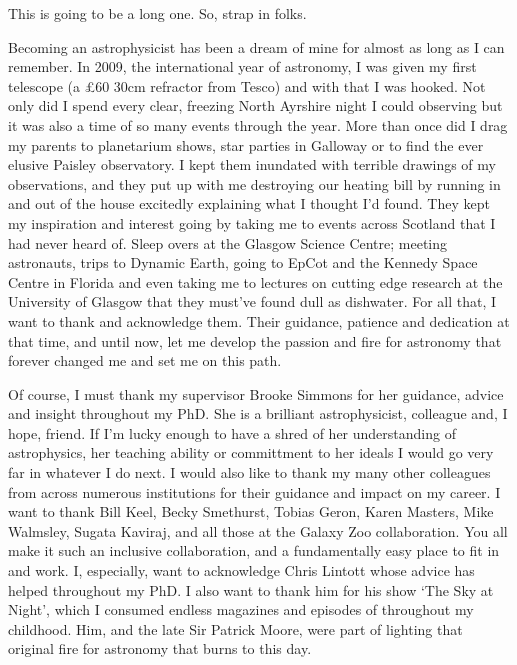 

\begin{acknowledgements}      %
This is going to be a long one. So, strap in folks.

Becoming an astrophysicist has been a dream of mine for almost as long as I can remember. In 2009, the international year of astronomy, I was given my first telescope (a £60 30cm refractor from Tesco) and with that I was hooked. Not only did I spend every clear, freezing North Ayrshire night I could observing but it was also a time of so many events through the year. More than once did I drag my parents to planetarium shows, star parties in Galloway or to find the ever elusive Paisley observatory. I kept them inundated with terrible drawings of my observations, and they put up with me destroying our heating bill by running in and out of the house excitedly explaining what I thought I'd found. They kept my inspiration and interest going by taking me to events across Scotland that I had never heard of. Sleep overs at the Glasgow Science Centre; meeting astronauts, trips to Dynamic Earth, going to EpCot and the Kennedy Space Centre in Florida and even taking me to lectures on cutting edge research at the University of Glasgow that they must've found dull as dishwater. For all that, I want to thank and acknowledge them. Their guidance, patience and dedication at that time, and until now, let me develop the passion and fire for astronomy that forever changed me and set me on this path.

Of course, I must thank my supervisor Brooke Simmons for her guidance, advice and insight throughout my PhD. She is a brilliant astrophysicist, colleague and, I hope, friend. If I'm lucky enough to have a shred of her understanding of astrophysics, her teaching ability or committment to her ideals I would go very far in whatever I do next. I would also like to thank my many other colleagues from across numerous institutions for their guidance and impact on my career. I want to thank Bill Keel, Becky Smethurst, Tobias Geron, Karen Masters, Mike Walmsley, Sugata Kaviraj, and all those at the Galaxy Zoo collaboration. You all make it such an inclusive collaboration, and a fundamentally easy place to fit in and work. I, especially, want to acknowledge Chris Lintott whose advice has helped throughout my PhD. I also want to thank him for his show `The Sky at Night', which I consumed endless magazines and episodes of throughout my childhood. Him, and the late Sir Patrick Moore, were part of lighting that original fire for astronomy that burns to this day.







\end{acknowledgements}



